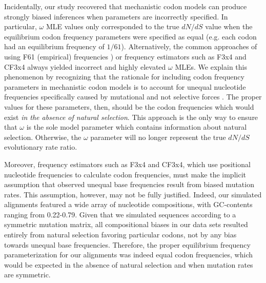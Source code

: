 \documentclass[11pt]{article}
\begin{document}
Incidentally, our study recovered that mechanistic codon models can produce strongly biased inferences when parameters are incorrectly specified. In particular, $\omega$ MLE values only corresponded to the true $dN/dS$ value when the equilibrium codon frequency parameters were specified as equal (e.g. each codon had an equilibrium frequency of $1/61$). Alternatively, the common approaches of using F61 (empirical) frequencies \cite{GoldmanYang1994}) or frequency estimators such as F3x4 \cite{MuseGaut1994} and CF3x4 \cite{Pond2010} always yielded incorrect and highly elevated $\omega$ MLEs. We explain this phenomenon by recognizing that the rationale for including codon frequency parameters in mechanistic codon  models is to account for unequal nucleotide frequencies specifically caused by mutational and not selective forces \cite{YN00, Yang2006}. The proper values for these parameters, then, should be the codon frequencies which would exist \textit{in the absence of natural selection}. This approach is the only way to ensure that $\omega$ is the sole model parameter which contains information about natural selection. Otherwise, the $\omega$ parameter will no longer represent the true $dN/dS$ evolutionary rate ratio.

Moreover, frequency estimators such as F3x4 and CF3x4, which use positional nucleotide frequencies to calculate codon frequencies, must make the implicit assumption that observed unequal base frequencies result from biased mutation rates.
This assumption, however, may not be fully justified. Indeed, our simulated alignments featured a wide array of nucleotide compositions, with GC-contents ranging from 0.22-0.79. Given that we simulated sequences according to a symmetric mutation matrix, all compositional biases in our data sets resulted entirely from natural selection favoring particular codons, not by any bias towards unequal base frequencies. Therefore, the proper equilibrium frequency parameterization for our alignments was indeed equal codon frequencies, which would be expected in the absence of natural selection and when mutation rates are symmetric. 
\end{document}
